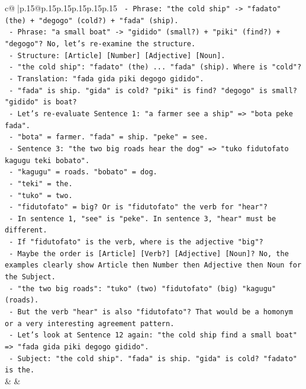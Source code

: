 \documentclass{article}
\begin{document}
{\begin{supertabular}{c@{$\;$}|p{.15\linewidth}@{}p{.15\linewidth}p{.15\linewidth}p{.15\linewidth}p{.15\linewidth}p{.15\linewidth}}
{{{\texttt{            {-} Phrase: "the cold ship" {-}> "fadato" (the) + "degogo" (cold?) + "fada" (ship).} \\
\texttt{            {-} Phrase: "a small boat" {-}> "gidido" (small?) + "piki" (find?) + "degogo"? No, let's re{-}examine the structure.} \\
\texttt{            {-} Structure: {[}Article{]} {[}Number{]} {[}Adjective{]} {[}Noun{]}.} \\
\texttt{            {-} "the cold ship": "fadato" (the) ... "fada" (ship). Where is "cold"?} \\
\texttt{            {-} Translation: "fada gida piki degogo gidido".} \\
\texttt{            {-} "fada" is ship. "gida" is cold? "piki" is find? "degogo" is small? "gidido" is boat?} \\
\texttt{            {-} Let's re{-}evaluate Sentence 1: "a farmer see a ship" => "bota peke fada".} \\
\texttt{                {-} "bota" = farmer. "fada" = ship. "peke" = see.} \\
\texttt{            {-} Sentence 3: "the two big roads hear the dog" => "tuko fidutofato kagugu teki bobato".} \\
\texttt{                {-} "kagugu" = roads. "bobato" = dog.} \\
\texttt{                {-} "teki" = the.} \\
\texttt{                {-} "tuko" = two.} \\
\texttt{                {-} "fidutofato" = big? Or is "fidutofato" the verb for "hear"?} \\
\texttt{                {-} In sentence 1, "see" is "peke". In sentence 3, "hear" must be different.} \\
\texttt{                {-} If "fidutofato" is the verb, where is the adjective "big"?} \\
\texttt{                {-} Maybe the order is {[}Article{]} {[}Verb?{]} {[}Adjective{]} {[}Noun{]}? No, the examples clearly show Article then Number then Adjective then Noun for the Subject.} \\
\texttt{                {-} "the two big roads": "tuko" (two) "fidutofato" (big) "kagugu" (roads).} \\
\texttt{                {-} But the verb "hear" is also "fidutofato"? That would be a homonym or a very interesting agreement pattern.} \\
\texttt{                {-} Let's look at Sentence 12 again: "the cold ship find a small boat" => "fada gida piki degogo gidido".} \\
\texttt{                    {-} Subject: "the cold ship". "fada" is ship. "gida" is cold? "fadato" is the.} \\
            }
        }
    }
    & & \\ \\


\end{supertabular}}
\end{document}
